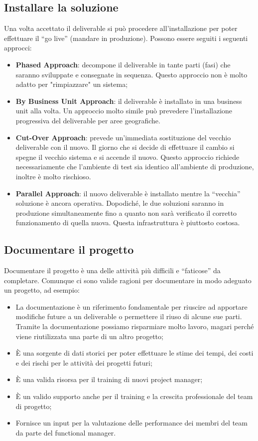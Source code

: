 \subsection{Installare la soluzione}
Una volta accettato il deliverable si può procedere all’installazione per poter effettuare il “go live” (mandare in produzione). Possono essere seguiti i seguenti approcci:
\begin{itemize}
	\item \textbf{Phased Approach}: decompone il deliverable in tante parti (fasi) che saranno sviluppate e consegnate in sequenza. Questo approccio non è molto adatto per "rimpiazzare" un sistema;
	\item \textbf{By Business Unit Approach}: il deliverable è installato in una business unit alla volta. Un approccio molto simile può prevedere l’installazione progressiva del deliverable per aree geografiche.
	\item \textbf{Cut-Over Approach}: prevede un’immediata sostituzione del vecchio deliverable con il nuovo. Il giorno che si decide di effettuare il cambio si spegne il vecchio sistema e si accende il nuovo. Questo approccio richiede necessariamente che l’ambiente di test sia identico all’ambiente di produzione, inoltre è molto rischioso.
	\item \textbf{Parallel Approach}: il nuovo deliverable è installato mentre la “vecchia” soluzione è ancora operativa. Dopodiché, le due soluzioni saranno in produzione simultaneamente fino a quanto non sarà verificato il corretto funzionamento di quella nuova. Questa infrastruttura è piuttosto costosa.
\end{itemize}
\subsection{Documentare il progetto}
Documentare il progetto è una delle attività più difficili e “faticose” da completare. Comunque ci sono valide ragioni per documentare in modo adeguato un progetto, ad esempio:
\begin{itemize}
	\item La documentazione è un riferimento fondamentale per riuscire ad apportare modifiche future a un deliverable o permettere il riuso di alcune sue parti. Tramite la documentazione possiamo risparmiare molto lavoro, magari perché viene riutilizzata una parte di un altro progetto;
	\item È una sorgente di dati storici per poter effettuare le stime dei tempi, dei costi e dei rischi per le attività dei progetti futuri;
	\item È una valida risorsa per il training di nuovi project manager;
	\item È un valido supporto anche per il training e la crescita professionale del team di progetto;
	\item Fornisce un input per la valutazione delle performance dei membri del team da parte del functional manager.
\end{itemize}
